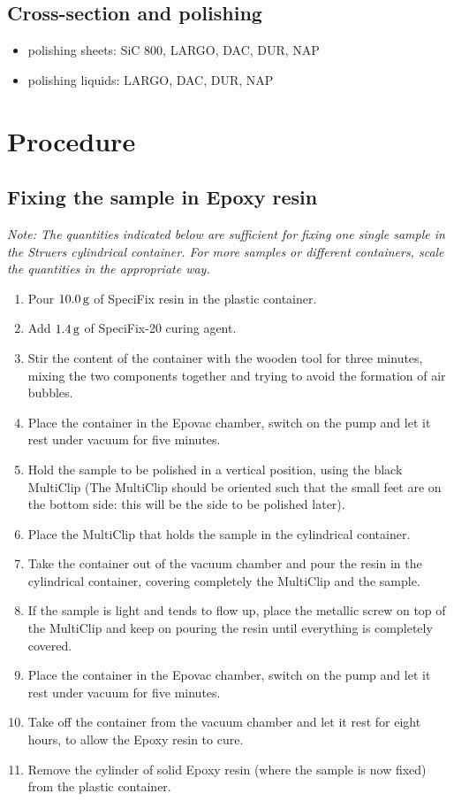 \begin{appendices}
\subsection*{Cross-section and polishing}
\begin{itemize}
\item polishing sheets: SiC 800, LARGO, DAC, DUR, NAP
\item polishing liquids: LARGO, DAC, DUR, NAP
\end{itemize}

\section*{Procedure}
\subsection*{Fixing the sample in Epoxy resin}
\textit{Note: The quantities indicated below are sufficient for fixing one single sample in the Struers cylindrical container. For more samples or different containers, scale the quantities in the appropriate way.}


\begin{enumerate}

\item Pour $10.0\,\rm{g}$ of SpeciFix resin in the plastic container.
\item Add $1.4\,\rm{g}$ of SpeciFix-20 curing agent.
\item Stir the content of the container with the wooden tool for three minutes, mixing the two components together and trying to avoid the formation of air bubbles.
\item Place the container in the Epovac chamber, switch on the pump and let it rest under vacuum for five minutes.
\item Hold the sample to be polished in a vertical position, using the black MultiClip (The MultiClip should be oriented such that the small feet are on the bottom side: this will be the side to be polished later).
\item Place the MultiClip that holds the sample in the cylindrical container.
\item Take the container out of the vacuum chamber and pour the resin in the cylindrical container, covering completely the MultiClip and the sample.
\item If the sample is light and tends to flow up, place the metallic screw on top of the MultiClip and keep on pouring the resin until everything is completely covered.
\item Place the container in the Epovac chamber, switch on the pump and let it rest under vacuum for five minutes.
\item Take off the container from the vacuum chamber and let it rest for eight hours, to allow the Epoxy resin to cure.
\item Remove the cylinder of solid Epoxy resin (where the sample is now fixed) from the plastic container.
\end{enumerate}

\end{appendices}

